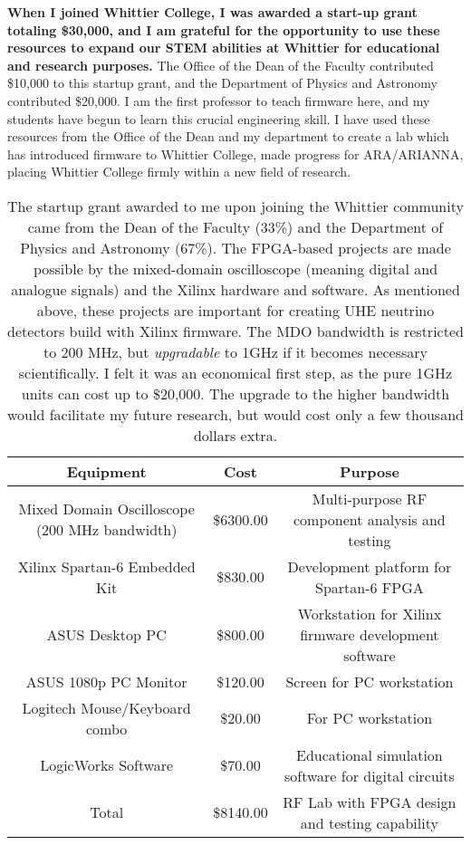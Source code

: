 \documentclass[../../main.tex]{subfiles}
\begin{document}
\textbf{When I joined Whittier College, I was awarded a start-up grant totaling \$30,000, and I am grateful for the opportunity to use these resources to expand our STEM abilities at Whittier for educational and research purposes.}  The Office of the Dean of the Faculty contributed \$10,000 to this startup grant, and the Department of Physics and Astronomy contributed \$20,000.  I am the first professor to teach firmware here, and my students have begun to learn this crucial engineering skill.  I have used these resources from the Office of the Dean and my department to create a lab which has introduced firmware to Whittier College, made progress for ARA/ARIANNA, placing Whittier College firmly within a new field of research.

\begin{table}
\small
\centering
\begin{tabular}{|c|c|c|}
\hline \hline
Equipment & Cost & Purpose \\ \hline
Mixed Domain Oscilloscope (200 MHz bandwidth) & \$6300.00 & Multi-purpose RF component analysis and testing \\ \hline
Xilinx Spartan-6 Embedded Kit & \$830.00 & Development platform for Spartan-6 FPGA \\ \hline
ASUS Desktop PC & \$800.00 & Workstation for Xilinx firmware development software \\ \hline
ASUS 1080p PC Monitor & \$120.00 & Screen for PC workstation \\ \hline
Logitech Mouse/Keyboard combo & \$20.00 & For PC workstation \\ \hline
LogicWorks Software & \$70.00 & Educational simulation software for digital circuits \\ \hline
Total & \$8140.00 & RF Lab with FPGA design and testing capability \\ \hline
\hline
\end{tabular}
\caption{\label{tab:fund2} The startup grant awarded to me upon joining the Whittier community came from the Dean of the Faculty (33\%) and the Department of Physics and Astronomy (67\%).  The FPGA-based projects are made possible by the mixed-domain oscilloscope (meaning digital and analogue signals) and the Xilinx hardware and software.  As mentioned above, these projects are important for creating UHE neutrino detectors build with Xilinx firmware.  The MDO bandwidth is restricted to 200 MHz, but \textit{upgradable} to 1GHz if it becomes necessary scientifically.  I felt it was an economical first step, as the pure 1GHz units can cost up to \$20,000.  The upgrade to the higher bandwidth would facilitate my future research, but would cost only a few thousand dollars extra.}
\end{table}
\end{document}
